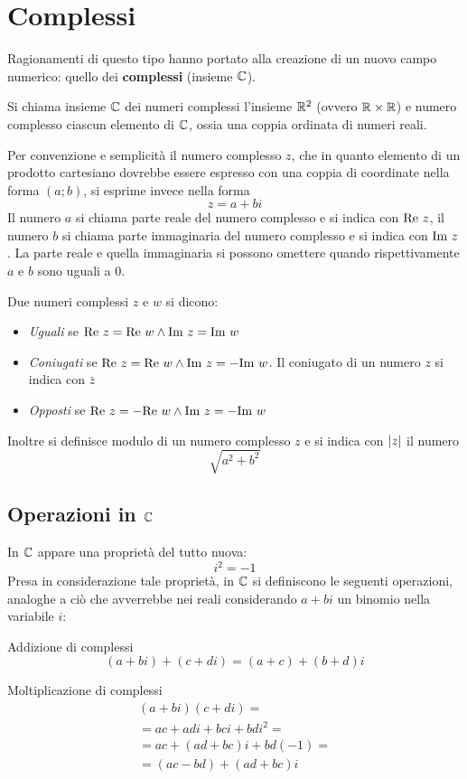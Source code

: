 \section{Complessi}
Ragionamenti di questo tipo hanno portato alla creazione di un nuovo campo numerico: quello dei \textbf{complessi} (insieme $\mathbb{C}$).

\begin{defin}
	Si chiama insieme $\mathbb{C}$ dei numeri complessi l'insieme $\mathbb{R}^2$ (ovvero $\mathbb{R}\times\mathbb{R}$) e numero complesso ciascun elemento di $\mathbb{C}$, ossia una coppia ordinata di numeri reali.
\end{defin}
Per convenzione e semplicità il numero complesso $z$, che in quanto elemento di un prodotto cartesiano dovrebbe essere espresso con una coppia di coordinate nella forma $(a;b)$, si esprime invece nella forma
\[
	z = a + bi
\]
Il numero $a$ si chiama parte reale del numero complesso e si indica con $\textrm{Re } z$, il numero $b$ si chiama parte immaginaria del numero complesso e si indica con $\textrm{Im } z$. La parte reale e quella immaginaria si possono omettere quando rispettivamente $a$ e $b$ sono uguali a $0$.

\begin{defin}
	Due numeri complessi $z$ e $w$ si dicono:
	\begin{itemize}
		\item \emph{Uguali} se $\textrm{Re } z=\textrm{Re } w\land\textrm{Im } z=\textrm{Im } w$
		\item \emph{Coniugati} se $\textrm{Re } z=\textrm{Re } w\land\textrm{Im } z=-\textrm{Im } w$. Il coniugato di un numero $z$ si indica con $\bar z$
		\item \emph{Opposti} se $\textrm{Re } z=-\textrm{Re } w\land\textrm{Im } z=-\textrm{Im } w$
	\end{itemize}
	Inoltre si definisce modulo di un numero complesso $z$ e si indica con $\left\lvert z \right\rvert$ il numero
	\[
		\sqrt{a^2+b^2}
	\]
\end{defin}


\subsection{Operazioni in \texorpdfstring{$\mathbb{C}$}{C}}
In $\mathbb{C}$ appare una proprietà del tutto nuova:
\[
	i^2=-1
\]
Presa in considerazione tale proprietà, in $\mathbb{C}$ si definiscono le seguenti operazioni, analoghe a ciò che avverrebbe nei reali considerando $a+bi$ un binomio nella variabile $i$:
\begin{defin}{Addizione di complessi}
	\[
		(a+bi)+(c+di)=(a+c)+(b+d)i
	\]
\end{defin}
\begin{defin}{Moltiplicazione di complessi}
	\begin{gather*}
		(a+bi)(c+di)=\\
		=ac+adi+bci+bdi^2=\\
		=ac+(ad+bc)i+bd(-1)=\\
		=(ac-bd)+(ad+bc)i
	\end{gather*}
\end{defin}


